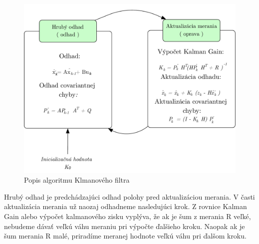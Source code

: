 \begin{figure}[H]
\begin{center}
	\includegraphics[scale=0.33]{images/kalman}
	\caption{Popis algoritmu Klmanového filtra}
	\end{center}
\end{figure}

Hrubý odhad je predchádzajúci odhad polohy pred aktualizáciou merania. V časti aktualizácia merania už naozaj odhadneme nasledujúci krok. Z rovnice Kalman Gain alebo výpočet kalmanového zisku vyplýva, že ak je šum z merania R veľké, nebudeme dávať veľkú váhu meraniu pri výpočte ďalšieho kroku. Naopak ak je šum merania R malé, priradíme meranej hodnote veľkú váhu pri ďalšom kroku.  